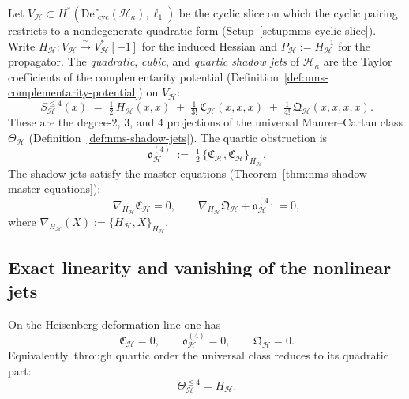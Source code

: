 \begin{definition}
\label{def:heisenberg-shadow-jets}
Let $V_{\mathcal{H}} \subset H^*(\mathrm{Def}_{\mathrm{cyc}}
(\mathcal{H}_\kappa), \ell_1)$ be the cyclic slice on which the
cyclic pairing restricts to a nondegenerate quadratic form
(Setup~\ref{setup:nms-cyclic-slice}). Write
$H_{\mathcal{H}} \colon V_{\mathcal{H}} \xrightarrow{\sim}
V_{\mathcal{H}}^*[-1]$ for the induced Hessian and
$P_{\mathcal{H}} := H_{\mathcal{H}}^{-1}$ for the propagator.
The \emph{quadratic}, \emph{cubic}, and \emph{quartic shadow jets}
of $\mathcal{H}_\kappa$ are the Taylor coefficients of the
complementarity potential
(Definition~\ref{def:nms-complementarity-potential}) on $V_{\mathcal{H}}$:
\begin{equation}\label{eq:heisenberg-shadow-expansion}
S_{\mathcal{H}}^{\le 4}(x)
\;=\;
\tfrac{1}{2}\,H_{\mathcal{H}}(x,x)
\;+\;
\tfrac{1}{3!}\,\mathfrak{C}_{\mathcal{H}}(x,x,x)
\;+\;
\tfrac{1}{4!}\,\mathfrak{Q}_{\mathcal{H}}(x,x,x,x).
\end{equation}
These are the degree-$2$, $3$, and $4$ projections of the universal
Maurer--Cartan class $\Theta_{\mathcal{H}}$
(Definition~\ref{def:nms-shadow-jets}). The quartic obstruction is
\begin{equation}\label{eq:heisenberg-quartic-obstruction}
\mathfrak{o}_{\mathcal{H}}^{(4)}
\;:=\;
\tfrac{1}{2}\,\{\mathfrak{C}_{\mathcal{H}},
\mathfrak{C}_{\mathcal{H}}\}_{H_{\mathcal{H}}}.
\end{equation}
The shadow jets satisfy the master equations
(Theorem~\ref{thm:nms-shadow-master-equations}):
\begin{equation}\label{eq:heisenberg-master-equations}
\nabla_{H_{\mathcal{H}}} \mathfrak{C}_{\mathcal{H}} = 0,
\qquad
\nabla_{H_{\mathcal{H}}} \mathfrak{Q}_{\mathcal{H}}
+ \mathfrak{o}_{\mathcal{H}}^{(4)} = 0,
\end{equation}
where $\nabla_{H_{\mathcal{H}}}(X) :=
\{H_{\mathcal{H}}, X\}_{H_{\mathcal{H}}}$.
\end{definition}

\subsection{Exact linearity and vanishing of the nonlinear jets}
\label{subsec:heisenberg-exact-linearity}

\begin{theorem}
\label{thm:heisenberg-exact-linearity}
On the Heisenberg deformation line one has
\begin{equation}\label{eq:heisenberg-shadow-vanishing}
\mathfrak{C}_{\mathcal{H}} = 0,
\qquad
\mathfrak{o}_{\mathcal{H}}^{(4)} = 0,
\qquad
\mathfrak{Q}_{\mathcal{H}} = 0.
\end{equation}
Equivalently, through quartic order the universal class reduces to its
quadratic part:
\begin{equation}\label{eq:heisenberg-theta-quadratic}
\Theta_{\mathcal{H}}^{\le 4} = H_{\mathcal{H}}.
\end{equation}
\end{theorem}

